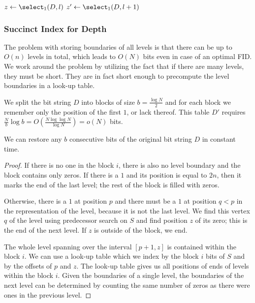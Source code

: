 \begin{algorithm}
\begin{algorithmic}
	\State $z \gets \select_1(D, l)$ 
	\State $z' \gets \select_1(D, l + 1)$ 
	\State {}
\EndFunction
\end{algorithmic}
\end{algorithm}

\begin{algorithm}
\begin{algorithmic}
	\State {}
\EndFunction
\end{algorithmic}
\end{algorithm}

\subsubsection{Succinct Index for Depth}\label{ss:louds-depth}

The problem with storing boundaries of all levels is that there can be up to $O(n)$ levels in total, which leads to $O(N)$ bits even in case of an optimal FID.
We work around the problem by utilizing the fact that if there are many levels, they must be short.
They are in fact short enough to precompute the level boundaries in a look-up table.

We split the bit string $D$ into blocks of size $b = \frac{\log N}{2}$ and for each block we remember only the position of the first $1$, or lack thereof.
This table $D'$ requires $\frac{N}{b} \log b = O(\frac{N \log\log N}{\log N}) = o(N)$ bits.

\begin{lemma}
	We can restore any $b$ consecutive bits of the original bit string $D$ in constant time.
\end{lemma}
\begin{proof}
	If there is no one in the block $i$, there is also no level boundary and the block contains only zeros.
	If there is a $1$ and its position is equal to $2n$, then it marks the end of the last level; the rest of the block is filled with zeros.

	Otherwise, there is a $1$ at position $p$ and there must be a $1$ at position $q < p$ in the representation of the level, because it is not the last level.
	We find this vertex $q$ of the level using predecessor search on $S$ and find position $z$ of its zero; this is the end of the next level.
	If $z$ is outside of the block, we end.
	
	The whole level spanning over the interval $[p + 1, z]$ is contained within the block $i$.
	We can use a look-up table \blockOfD{} which we index by the block $i$ bits of $S$ and by the offsets of $p$ and $z$.
	The look-up table gives us all positions of ends of levels within the block $i$.
	Given the boundaries of a single level, the boundaries of the next level can be determined by counting the same number of zeros as there were ones in the previous level.
\end{proof}

